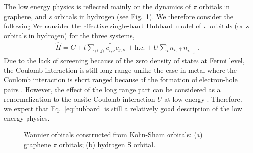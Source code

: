 The low energy physics is reflected mainly on the dynamics of $\pi$ orbitals in graphene, and $s$ orbitals in hydrogen (see Fig.~\ref{fig:honeycomb_wan}). We therefore consider the following We consider the effective single-band Hubbard model of $\pi$ orbitals (or $s$ orbitals in hydrogen) for the three systems, 
\begin{eqnarray}\label{eq:hubbard}
\hat{H} = C + t\sum_{\langle i,j\rangle}c_{i, \sigma}^\dagger c_{j, \sigma} + \text{h.c.} + U\sum_{i}n_{i, \uparrow}n_{i, \downarrow}\,. 
\end{eqnarray}
Due to the lack of screening because of the zero density of states at Fermi level, the Coulomb interaction is still long range unlike the case in metal where the Coulomb interaction is short ranged because of the formation of electron-hole pairs \cite{Zheng2016}. 
However, the effect of the long range part can be considered as a renormalization to the onsite Coulomb interaction $U$ at low energy \cite{Schuler2013, Changlani2015}. 
Therefore, we expect that Eq.~\eqref{eq:hubbard} is still a relatively good description of the low energy physics. 
\begin{figure}[hbt]
  \centering  
       \caption{Wannier orbitals constructed from Kohn-Sham orbitals: (a) graphene $\pi$ orbitals; (b) hydrogen S orbital. }
\label{fig:honeycomb_wan}
\end{figure}

